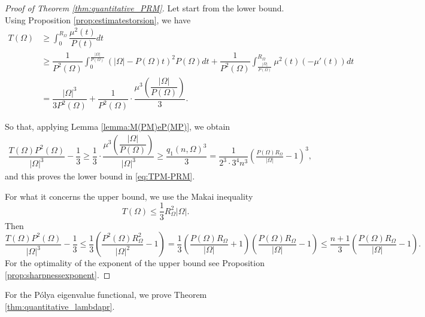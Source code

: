 \documentclass[oneside,a4paper,11pt,notitlepage]{article}
\newcommand{\abs}[1]{{\left|#1\right|}}
\theoremstyle{definition}
\theoremstyle{plain}
\theoremstyle{definition}
\begin{document}
\begin{proof}[Proof of Theorem \ref{thm:quantitative_PRM}]Let start from the lower bound.
 Using Proposition \ref{prop:estimatestorsion}, we have
  \begin{align*}
     T(\Omega)&\geq \int_{0}^{R_\Omega}\dfrac{\mu^2(t)}{P(t)}dt\\
      &\geq \dfrac{1}{P^2(\Omega)}\int_0^{\frac{|\Omega|}{P(\Omega)}}\left(|\Omega|-P(\Omega)t\right)^2 P(\Omega) dt
      +\dfrac{1}{P^2(\Omega)}\int_{\frac{|\Omega|}{P(\Omega)}}^{R_\Omega} \mu^2(t)(-\mu'(t))dt \\
      & =\dfrac{|\Omega|^3}{3 P^2(\Omega)}+\dfrac{1}{P^2(\Omega)}\cdot\dfrac{\mu^3\left(\dfrac{|\Omega|}{P(\Omega)}\right)}{3}.
  \end{align*}

 So that, applying Lemma \ref{lemma:M(PM)eP(MP)}, we obtain 
\begin{align*}
      \dfrac{T(\Omega)P^2(\Omega)}{|\Omega|^3}-\dfrac{1}{3}\geq
      \dfrac{1}{3}\cdot\dfrac{\mu^3\left(\dfrac{|\Omega|}{P(\Omega)}\right)}{|\Omega|^3}\geq \dfrac{q_1(n,\Omega)^3}{3}=\dfrac{1}{2^3\cdot3^4  n^3}\left(\frac{P(\Omega) R_\Omega}{\abs{\Omega}}-1\right)^3,
  \end{align*}
   and this proves the lower bound in \eqref{eq:TPM-PRM}.

\noindent For what it concerns the upper bound, we use the Makai inequality
  $$
  T(\Omega) \leq \frac{1}{3} R_\Omega^2 \abs{\Omega}.$$
Then
  $$
  \dfrac{T(\Omega)P^2(\Omega)}{|\Omega|^3}-\frac{1}{3} \leq \frac{1}{3}\left(\frac{P^2(\Omega) R^2_\Omega}{\abs{\Omega}^2}-1\right)=\frac{1}{3}\left(\frac{P(\Omega) R_\Omega}{\abs{\Omega}}+1\right)\left(\frac{P(\Omega) R_\Omega}{\abs{\Omega}}-1\right)\leq\frac{n+1}{3}\left(\frac{P(\Omega) R_\Omega}{\abs{\Omega}}-1\right).$$
  For the optimality of the exponent of the upper bound see Proposition \ref{prop:sharpnessexponent}.
  
\end{proof}
For the P\'olya eigenvalue functional, we prove Theorem \ref{thm:quantitative_lambdapr}.
\end{document}
